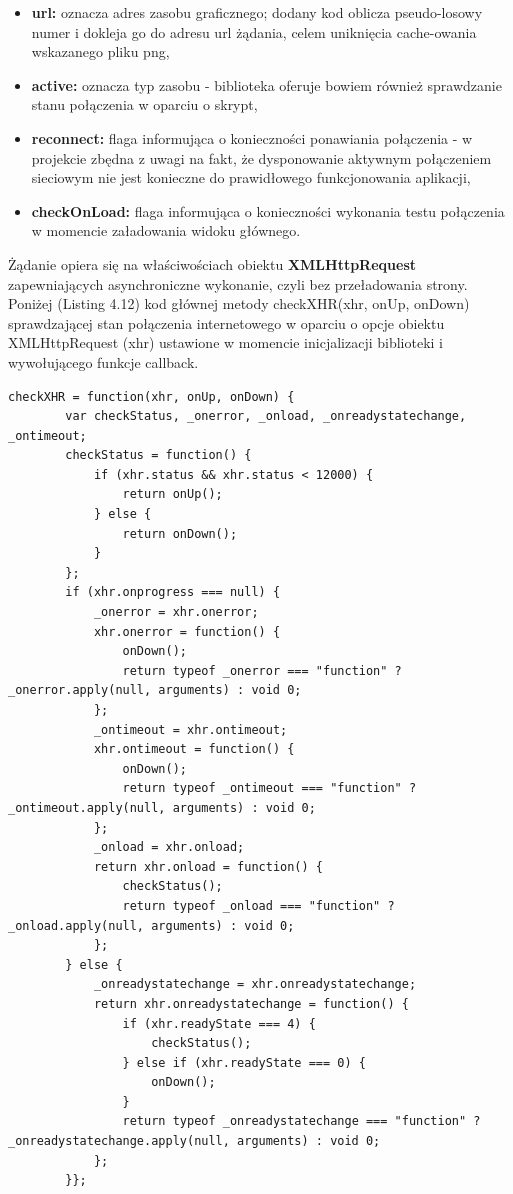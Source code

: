 \begin{itemize}
\item \textbf{url:} oznacza adres zasobu graficznego; dodany kod oblicza pseudo-losowy numer i dokleja go do adresu url żądania, celem uniknięcia cache-owania wskazanego pliku png,
\item \textbf{active:} oznacza typ zasobu - biblioteka oferuje bowiem również sprawdzanie stanu połączenia w oparciu o skrypt,
\item \textbf{reconnect:} flaga informująca o konieczności ponawiania połączenia - w projekcie zbędna z uwagi na fakt, że dysponowanie aktywnym połączeniem sieciowym nie jest konieczne do prawidłowego funkcjonowania aplikacji,
\item \textbf{checkOnLoad:} flaga informująca o konieczności wykonania testu połączenia w momencie załadowania widoku głównego.
\end{itemize}

Żądanie opiera się na właściwościach obiektu \textbf{XMLHttpRequest} zapewniających asynchroniczne wykonanie, czyli bez przeładowania strony. Poniżej (Listing 4.12) kod głównej metody checkXHR(xhr, onUp, onDown) sprawdzającej stan połączenia internetowego w oparciu o opcje obiektu XMLHttpRequest (xhr) ustawione w momencie inicjalizacji biblioteki i wywołującego funkcje callback.

\begin{lstlisting}[caption=Metoda checkXHR() wykonująca żądanie AJAX załadowania zasobu graficznego., label=amb, captionpos=b]
checkXHR = function(xhr, onUp, onDown) {
        var checkStatus, _onerror, _onload, _onreadystatechange, _ontimeout;
        checkStatus = function() {
            if (xhr.status && xhr.status < 12000) {
                return onUp();
            } else {
                return onDown();
            }
        };
        if (xhr.onprogress === null) {
            _onerror = xhr.onerror;
            xhr.onerror = function() {
                onDown();
                return typeof _onerror === "function" ? _onerror.apply(null, arguments) : void 0;
            };
            _ontimeout = xhr.ontimeout;
            xhr.ontimeout = function() {
                onDown();
                return typeof _ontimeout === "function" ? _ontimeout.apply(null, arguments) : void 0;
            };
            _onload = xhr.onload;
            return xhr.onload = function() {
                checkStatus();
                return typeof _onload === "function" ? _onload.apply(null, arguments) : void 0;
            };
        } else {
            _onreadystatechange = xhr.onreadystatechange;
            return xhr.onreadystatechange = function() {
                if (xhr.readyState === 4) {
                    checkStatus();
                } else if (xhr.readyState === 0) {
                    onDown();
                }
                return typeof _onreadystatechange === "function" ? _onreadystatechange.apply(null, arguments) : void 0;
            };
        }};
\end{lstlisting}

